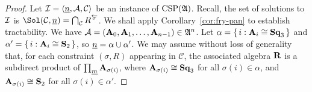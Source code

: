 \begin{example}
 
 \begin{proof}
 Let $\mathcal{I}=\langle\underline{n},\mathcal A, \mathcal C\rangle$ be an instance of $\operatorname{CSP}(\mathfrak A)$. 
 Recall, the set of solutions to $\mathcal{I}$ is
 $\Sol(\sC, \nn) = \bigcap_{\sC} R^{\overleftarrow{\sigma}}$.
 We shall apply Corollary~\ref{cor:fry-pan} to establish 
 tractability.  
 We have $\mathcal A = (\mathbf{A}_0, \mathbf{A}_1,\dots,\mathbf{A}_{n-1}) \in \mathfrak A^n$. Let 
 $\alpha=\{\,i : \mathbf{A}_i \cong \mathbf{Sq}_{3}\,\}$ and $\alpha'=\{\,i : \mathbf{A}_i \cong \mathbf S_2\,\}$, so 
 $\underline{n} = \alpha \cup \alpha'$.  
 We may assume without loss of generality that, 
 for each constraint $(\sigma, R)$ appearing in $\mathcal C$, the associated algebra
 $\mathbf{R}$ is a subdirect product of $\prod_{\underline{m}}\mathbf{A}_{\sigma(i)}$, where 
 $\mathbf{A}_{\sigma(i)} \cong \mathbf{Sq}_{3}$ for all $\sigma(i) \in \alpha$, and  
 $\mathbf{A}_{\sigma(i)} \cong \mathbf S_2$ for all $\sigma(i) \in \alpha'$.



\end{proof}
\end{example}
